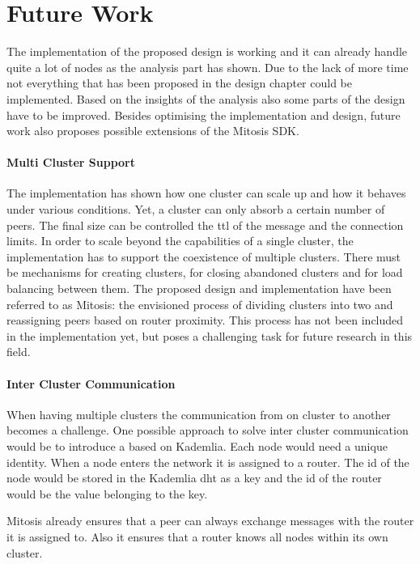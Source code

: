 \section{Future Work}\label{sec:future-work}
The implementation of the proposed design is working and it can already handle quite a lot of nodes as the analysis part has shown. Due to the lack of more time not everything that has been proposed in the design chapter could be implemented. Based on the insights of the analysis also some parts of the design have to be improved.
Besides optimising the implementation and design, future work also proposes possible extensions of the \gls{Mitosis} SDK.

\paragraph{Multi Cluster Support}
The implementation has shown how one cluster can scale up and how it behaves under various conditions. Yet, a cluster can only absorb a certain number of peers. The final size can be controlled the \gls{ttl} of the \routerAlive message and the connection limits. In order to scale beyond the capabilities of a single cluster, the implementation has to support the coexistence of multiple clusters. There must be mechanisms for creating clusters, for closing abandoned clusters and for load balancing between them. The proposed design and implementation have been referred to as \gls{Mitosis}: the envisioned process of dividing clusters into two and reassigning peers based on router proximity. This process has not been included in the implementation yet, but poses a challenging task for future research in this field.

\paragraph{Inter Cluster Communication}
When having multiple clusters the communication from on cluster to another becomes a challenge. One possible approach to solve inter cluster communication would be to introduce a  based on Kademlia. Each node would need a unique identity. When a node enters the network it is assigned to a router. The id of the node would be stored in the Kademlia \gls{dht} as a key and the id of the router would be the value belonging to the key. 

Mitosis already ensures that a peer can always exchange messages with the router it is assigned to. Also it ensures that a router knows all nodes within its own cluster. 

